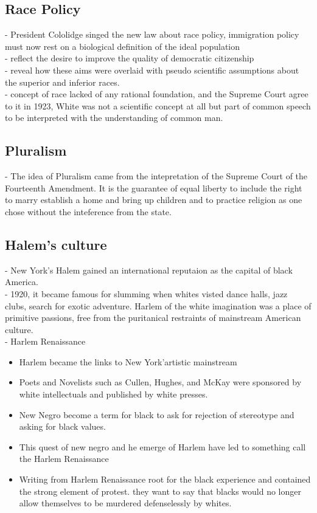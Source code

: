\documentclass{article}
\begin{document}
\subsection{ Race Policy}
- President Cololidge singed the new law about race policy, immigration policy must now rest on a biological definition of the ideal population\\
- reflect the desire to improve the quality of democratic citizenship\\
- reveal how these aims were overlaid with pseudo scientific assumptions about the superior and inferior races.\\
- concept of race lacked of any rational foundation, and the Supreme Court agree to it in 1923, White was not a scientific concept at all but part of common speech to be interpreted with the understanding of common man.\\

\subsection {Pluralism}
- The idea of Pluralism came from the intepretation of the Supreme Court of the Fourteenth Amendment. It is the guarantee of equal liberty to include the right to marry establish a home and bring up children and to practice religion as one chose without the inteference from the state.

\subsection{Halem's culture}
- New York's Halem gained an international reputaion as the capital of black America.\\
- 1920, it became famous for slumming when whites visted dance halls, jazz clubs, search for exotic adventure. Harlem of the white imagination was a place of primitive passions, free from the puritanical restraints of mainstream American culture.\\
- Harlem Renaissance\\
\begin{itemize}
\item Harlem became the links to New York'artistic mainstream
\item Poets and Novelists such as Cullen, Hughes, and McKay were sponsored by white intellectuals and published by white presses.
\item New Negro become a term for black to ask for rejection of stereotype and asking for black values.
\item This quest of new negro and he emerge of Harlem have led to something call the Harlem Renaissance
\item Writing from Harlem Renaissance root for the black experience and contained the strong element of protest. they want to say that blacks would no longer allow themselves to be murdered defenselessly by whites.
\end{itemize}
\end{document}
